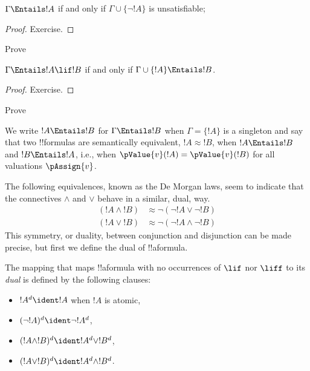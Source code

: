 \documentclass[../../../include/open-logic-section]{subfiles}
\begin{document}
\begin{prop}
  $\Gamma \Entails !A$ if and only if $\Gamma \cup \{\lnot !A\}$
  is unsatisfiable; 
\end{prop}

\begin{proof}
Exercise.
\end{proof}

\begin{prob}
Prove 
\end{prob}

\begin{thm}
   $\Gamma \Entails !A \lif !B$ if and only
  if $\Gamma \cup \{!A\} \Entails !B$.
\end{thm}

\begin{proof}
Exercise.
\end{proof}

\begin{prob}
Prove 
\end{prob}

We write $!A \Entails !B$ for $\Gamma \Entails !B$ when $\Gamma = \{!A\}$ is a singleton and say that two !!{formula}s are semantically equivalent, $!A \approx !B$, when $!A \Entails !B$ and $!B \Entails !A$, i.e., when $\pValue{v}(!A) = \pValue{v}(!B)$ for all valuations $\pAssign{v}$.

The following equivalences, known as the De Morgan laws, seem to indicate that the connectives $\land$ and $\lor$ behave in a similar, dual, way. 
  \begin{align*}
    ({!A} \land {!B}) &\approx \lnot(\lnot{!A} \lor \lnot{!B})\\
    ({!A} \lor {!B}) &\approx \lnot(\lnot{!A} \land \lnot{!B})
  \end{align*}
This symmetry, or duality, between conjunction and disjunction can be made precise, but first we define the dual of !!a{formula}.

\begin{defn}
The mapping that maps !!a{formula} with no occurrences of $\lif$ nor $\liff$ to its \emph{dual} is defined by the following clauses:
\begin{itemize}
  \item $!A^d \ident !A$ when $!A$ is atomic,
  \item $(\lnot !A )^d \ident \lnot !A^d$,
  \item $(!A \land !B)^d \ident !A^d \lor !B^d$,
  \item $(!A \lor !B)^d \ident !A^d \land !B^d$.
\end{itemize}
\end{defn}
\end{document}
